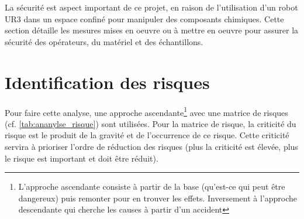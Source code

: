 La sécurité est aspect important de ce projet, en raison de l'utilisation d'un robot UR$3$ dans un espace confiné pour manipuler des composants chimiques. Cette section détaille les mesures mises en oeuvre ou à mettre en oeuvre pour assurer la sécurité des opérateurs, du matériel et des échantillons.
\section{Identification des risques}\label{sec:identification_risque}
Pour faire cette analyse, une approche ascendante\footnote{L'approche ascendante consiste à partir de la base (qu'est-ce qui peut être dangereux) puis remonter pour en trouver les effets. Inversement à l'approche descendante qui cherche les causes à partir d'un accident} avec une matrice de risques (cf. \autoref{tab:ananylse_risque}) sont utilisées. Pour la matrice de risque, la criticité du risque est le produit de la gravité et de l'occurrence de ce risque. Cette criticité servira à prioriser l'ordre de réduction des risques (plus la criticité est élevée, plus le risque est important et doit être réduit).
